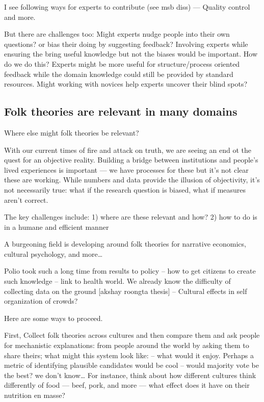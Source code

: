 I see following ways for experts to contribute (see msb diss) — Quality control  and more.

But there are challenges too: Might experts nudge people into their own questions? or bias their doing by suggesting feedback?
    Involving experts while ensuring the bring useful knowledge but not the biases would be important. How do we do this? Experts might be more useful for structure/process oriented feedback while the domain knowledge could still be provided by standard resources. Might working with novices help experts uncover their blind spots?



\subsection{Folk theories are relevant in many domains}
Where else might folk theories be relevant?

With our current times of fire and attack on truth, we are seeing an end ot the quest for an objective reality. Building a bridge between institutions and people’s lived experiences is important — we have processes for these but it’s not clear these are working. While numbers and data provide the illusion of objectivity, it’s not necessarily true: what if the research question is biased, what if measures aren’t correct. 

The key challenges include: 1) where are these relevant and how? 2) how to do is in a humane and efficient manner

A burgeoning field is developing around folk theories for narrative economics, cultural psychology, and more… 

Polio took such a long time from results to policy --  how to get citizens to create such knowledge -- link to health world. We already know the difficulty of collecting data on the ground [akshay roongta thesis] -- Cultural effects in self organization of crowds?

Here are some ways to proceed.

First, Collect folk theories across cultures and then compare them and ask people for mechanistic explanations: from people around the world by asking them to share theirs; what might this system look like: -- what would it enjoy. Perhaps a metric of identifying plausible candidates would be cool -- would majority vote be the best? we don't know… For instance, think about how different cultures think differently of food — beef, pork, and more — what effect does it have on their nutrition en masse?


